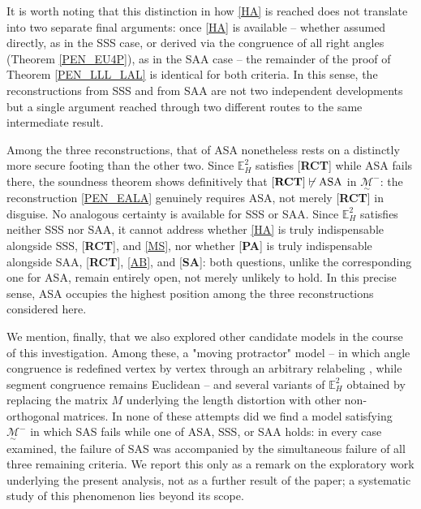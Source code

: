 \documentclass[11pt,a4paper]{article}
\theoremstyle{definition}
\theoremstyle{remark}
\numberwithin{equation}{section}
\newcommand{\MG}{\underset{\sim}{\mathcal{M}}} %
\begin{document}
It is worth noting that this distinction in how \ref{HA} is reached does not translate
into two separate final arguments: once \ref{HA} is available -- whether assumed directly, as
in the SSS case, or derived via the congruence of all right angles (Theorem
\ref{PEN_EU4P}), as in the SAA case -- the remainder of the proof of Theorem
\ref{PEN_LLL_LAL} is identical for both criteria. In this sense, the reconstructions from
SSS and from SAA are not two independent developments but a single argument reached
through two different routes to the same intermediate result.

Among the three reconstructions, that of ASA nonetheless rests on a distinctly more secure
footing than the other two. Since $\mathbb{E}_{H}^{2}$ satisfies [\textbf{RCT}] while ASA fails
there, the soundness theorem shows definitively that
$\textrm{[\textbf{RCT}]}\not\vdash\textrm{ASA}$ in $\MG^{-}$: the reconstruction
\eqref{PEN_EALA} genuinely requires ASA, not merely [\textbf{RCT}] in disguise. No analogous
certainty is available for SSS or SAA. Since $\mathbb{E}_{H}^{2}$ satisfies neither SSS nor SAA,
it cannot address whether \ref{HA} is truly indispensable alongside SSS, [\textbf{RCT}], and
\ref{MS}, nor whether [\textbf{PA}] is truly indispensable alongside SAA, [\textbf{RCT}],
\ref{AB}, and [\textbf{SA}]: both questions, unlike the corresponding one for ASA, remain
entirely open, not merely unlikely to hold. In this precise sense, ASA occupies the highest
position among the three reconstructions considered here.

We mention, finally, that we also explored other candidate models in the course of this
investigation. Among these, a "moving protractor" model -- in which angle congruence is
redefined vertex by vertex through an arbitrary relabeling \cite{Brown2019}, while segment congruence remains
Euclidean -- and several variants of $\mathbb{E}_{H}^{2}$ obtained by replacing the matrix $M$
underlying the length distortion with other non-orthogonal matrices. In none of these attempts
did we find a model satisfying $\MG^{-}$ in which SAS fails while one of ASA, SSS, or SAA holds:
in every case examined, the failure of SAS was accompanied by the simultaneous failure of all
three remaining criteria. We report this only as a remark on the exploratory work underlying
the present analysis, not as a further result of the paper; a systematic study of this
phenomenon lies beyond its scope.
\end{document}
